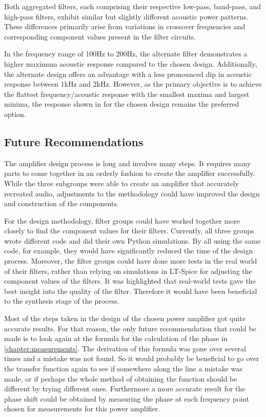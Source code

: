 Both aggregated filters, each comprising their respective low-pass, band-pass, and high-pass filters, exhibit similar but slightly different acoustic power patterns. These differences primarily arise from variations in crossover frequencies and corresponding component values present in the filter circuits.

In the frequency range of 100Hz to 200Hz, the alternate filter demonstrates a higher maximum acoustic response compared to the chosen design. Additionally, the alternate design offers an advantage with a less pronounced dip in acoustic response between 1kHz and 2kHz. However, as the primary objective is to achieve the flattest frequency/acoustic response with the smallest maxima and largest minima, the response shown in  for the chosen design remains the preferred option. 

\subsection{Future Recommendations}
The amplifier design process is long and involves many steps. It requires many parts to come together in an orderly fashion to create the amplifier successfully. While the three subgroups were able to create an amplifier that accurately recreated audio, adjustments to the methodology could have improved the design and construction of the components. 

For the design methodology, filter groups could have worked together more closely to find the component values for their filters. Currently, all three groups wrote different code and did their own Python simulations. By all using the same code, for example, they would have significantly reduced the time of the design process. Moreover, the filter groups could have done more tests in the real world of their filters, rather than relying on simulations in LT-Spice for adjusting the component values of the filters. It was highlighted that real-world tests gave the best insight into the quality of the filter. Therefore it would have been beneficial to the synthesis stage of the process.

Most of the steps taken in the design of the chosen power amplifier got quite accurate results. For that reason, the only future recommendation that could be made is to look again at the formula for the calculation of the phase in \ref{chapter:measurements}.  The derivation of this formula was gone over several times and a mistake was not found. So it would probably be beneficial to go over the transfer function again to see if somewhere along the line a mistake was made, or if perhaps the whole method of obtaining the function should be different by trying different ones. Furthermore a more accurate result for the phase shift could be obtained by measuring the phase at each frequency point chosen for measurements for this power amplifier.